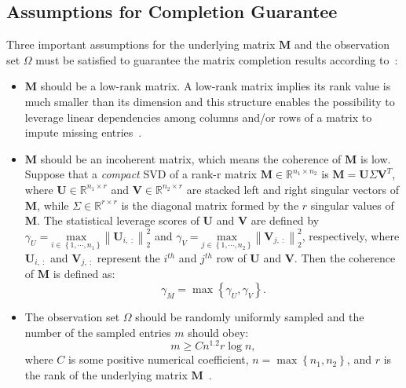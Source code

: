 \subsection{Assumptions for Completion Guarantee}
Three important assumptions for the underlying matrix $\mathbf{M}$ and the observation set $\Omega$ must be satisfied to guarantee the matrix completion results according to~\cite{candes2009exact}:
\begin{itemize}
    \item 
    $\mathbf{M}$ should be a low-rank matrix. A low-rank matrix implies its rank value is much smaller than its dimension and this structure enables the possibility to leverage linear dependencies among columns and/or rows of a matrix to impute missing entries~\cite{ongie2018tensor}. 
    \item
    $\mathbf{M}$ should be an incoherent matrix, which means the coherence of $\mathbf{M}$ is low. Suppose that a \textit{compact} SVD of a rank-r matrix $\mathbf{M}\in \mathbb{R}^{n_1\times n_2}$ is $\mathbf{M} = \mathbf{U}\Sigma\mathbf{V}^T$, where $\mathbf{U} \in \mathbb{R}^{n_1\times r}$ and $\mathbf{V}\in \mathbb{R}^{n_2\times r}$ are stacked left and right singular vectors of $\mathbf{M}$, while $\Sigma \in \mathbb{R}^{r\times r}$ is the diagonal matrix formed by the $r$ singular values of $\mathbf{M}$. The statistical leverage scores of $\mathbf{U}$ and $\mathbf{V}$ are defined by $\gamma_{U} = \underset{i\in \left \{ 1, \cdots, n_1 \right \}}{\text{max}}\left \| \mathbf{U}_{i,~:} \right \|^2_2$ and $\gamma_{V} = \underset{j\in \left \{ 1, \cdots, n_2 \right \}}{\text{max}}\left \| \mathbf{V}_{j,~ :} \right \|^2_2$, respectively, where $\mathbf{U}_{i,~:}$ and $\mathbf{V}_{j,~:}$ represent the $i^{th}$ and $j^{th}$ row of $\mathbf{U}$ and $\mathbf{V}$. Then the coherence of $\mathbf{M}$ is defined as:
    \begin{equation}
        \label{eq:coherence}
        \gamma_{M} = \max \left \{ \gamma_{U}, \gamma_{V} \right \}.
    \end{equation}
    \item
    The observation set $\Omega$ should be randomly uniformly sampled and the number of the sampled entries $m$ should obey: 
    \begin{equation}
        \label{eq:sampled_cond}
            m\geq Cn^{1.2}r\log n,
    \end{equation}
    where $C$ is some positive numerical coefficient, $n = \max\left \{ n_1, n_2 \right \}$, and $r$ is the rank of the underlying matrix $\mathbf{M}$~\cite{candes2009exact}.
\end{itemize}


